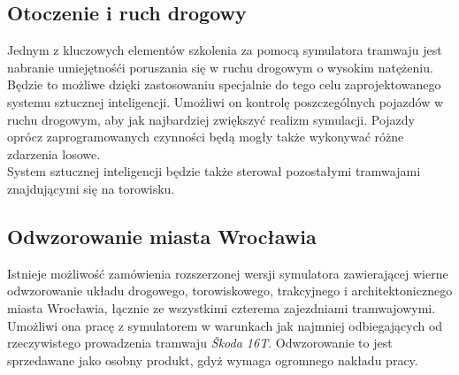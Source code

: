 \documentclass[12pt,a4paper]{article}
\begin{document}
\subsection{Otoczenie i ruch drogowy}
Jednym z kluczowych elementów szkolenia za pomocą symulatora tramwaju jest nabranie umiejętnośći
poruszania się w ruchu drogowym o wysokim natężeniu. Będzie to możliwe dzięki zastosowaniu
specjalnie do tego celu zaprojektowanego systemu sztucznej inteligencji. Umożliwi on kontrolę
poszczególnych pojazdów w ruchu drogowym, aby jak najbardziej zwiększyć realizm symulacji. Pojazdy
oprócz zaprogramowanych czynności będą mogły także wykonywać różne zdarzenia losowe.\\System
sztucznej inteligencji będzie także sterował pozostałymi tramwajami znajdującymi się na torowisku.

\subsection{Odwzorowanie miasta Wrocławia}
Istnieje możliwość zamówienia rozszerzonej wersji symulatora zawierającej wierne odwzorowanie układu
drogowego, torowiskowego, trakcyjnego i architektonicznego miasta Wrocławia, łącznie ze wszystkimi 
czterema zajezdniami tramwajowymi. Umożliwi ona pracę z symulatorem w warunkach jak najmniej 
odbiegających od rzeczywistego prowadzenia tramwaju {\it Škoda 16T}. Odwzorowanie to jest 
sprzedawane jako osobny produkt, gdyż wymaga ogromnego nakładu pracy.
\end{document}
